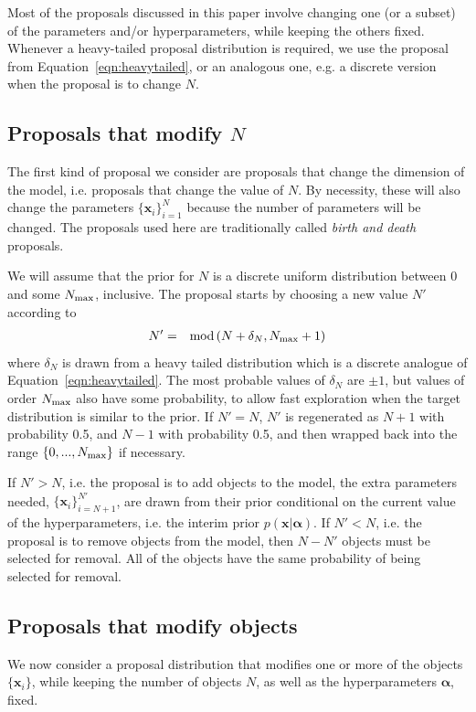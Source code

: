 \documentclass[letterpaper, 11pt]{article}
\newcommand{\hyperparams}{\boldsymbol{\alpha}}
\newcommand{\xx}{\mathbf{x}}
\begin{document}
Most of the proposals discussed in this paper involve changing one
(or a subset) of the parameters and/or hyperparameters, while keeping the
others fixed. Whenever a heavy-tailed proposal distribution
is required, we use the proposal from Equation~\ref{eqn:heavytailed},
or an analogous one, e.g. a discrete version when the proposal is to change $N$.


\subsection{Proposals that modify $N$}\label{sec:proposal1}
The first kind of proposal we consider are proposals that change the
dimension of the model, i.e. proposals that change the value of $N$. By
necessity, these will also change the parameters $\{\xx_i\}_{i=1}^N$ because
the number of parameters will be changed. The proposals used here are
traditionally called {\it birth and death} proposals.

We will assume that the prior for $N$ is a discrete uniform distribution
between 0 and some $N_{\rm max}$, inclusive. The proposal starts by choosing
a new value $N'$ according to
\begin{eqnarray}
N' &=& \textnormal{mod}\left(N + \delta_N, N_{\rm max} + 1\right)
\end{eqnarray}
where $\delta_N$ is drawn from a heavy tailed
distribution which is a discrete analogue of Equation~\ref{eqn:heavytailed}.
The most probable values of $\delta_N$ are $\pm 1$, but values
of order $N_{\rm max}$ also have some probability, to allow fast exploration
when the target distribution is similar to the prior. If $N' = N$, $N'$ is
regenerated as $N+1$ with probability 0.5, and $N-1$ with probability 0.5,
and then wrapped back into the range $\{0,...,N_{\rm max}\}$ if necessary.

If $N' > N$, i.e. the proposal is to add objects to the model,
the extra parameters needed, $\{\xx_i\}_{i=N+1}^{N'}$,
are drawn from their prior conditional on the current value of the
hyperparameters, i.e. the interim prior $p(\xx | \hyperparams)$.
If $N' < N$, i.e. the proposal is to remove objects from the model,
then $N - N'$ objects must be selected for removal. All
of the objects have the same probability of being selected for removal.

\subsection{Proposals that modify objects}\label{sec:proposal2}
We now consider a proposal distribution that modifies one or more of the
objects $\{\xx_i\}$, while keeping the number of objects $N$, as well as the
hyperparameters $\hyperparams$, fixed.
\end{document}
